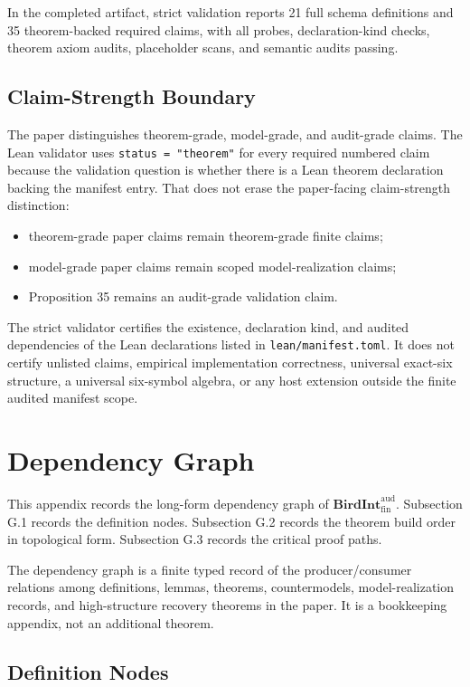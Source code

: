 \documentclass[11pt]{article}
\providecommand{\tightlist}{}
\theoremstyle{definition}
\begin{document}
In the completed artifact, strict validation reports 21 full schema definitions and 35 theorem-backed required claims, with all probes, declaration-kind checks, theorem axiom audits, placeholder scans, and semantic audits passing.

\subsection{Claim-Strength Boundary}

The paper distinguishes theorem-grade, model-grade, and audit-grade claims. The Lean validator uses \texttt{status\ =\ "theorem"} for every required numbered claim because the validation question is whether there is a Lean theorem declaration backing the manifest entry. That does not erase the paper-facing claim-strength distinction:

\begin{itemize}
\tightlist
\item
  theorem-grade paper claims remain theorem-grade finite claims;
\item
  model-grade paper claims remain scoped model-realization claims;
\item
  Proposition 35 remains an audit-grade validation claim.
\end{itemize}

The strict validator certifies the existence, declaration kind, and audited dependencies of the Lean declarations listed in \texttt{lean/manifest.toml}. It does not certify unlisted claims, empirical implementation correctness, universal exact-six structure, a universal six-symbol algebra, or any host extension outside the finite audited manifest scope.
 \section{Dependency Graph}

This appendix records the long-form dependency graph of \(\mathbf{BirdInt}^{\mathrm{aud}}_{\mathrm{fin}}\). Subsection G.1 records the definition nodes. Subsection G.2 records the theorem build order in topological form. Subsection G.3 records the critical proof paths.

The dependency graph is a finite typed record of the producer/consumer relations among definitions, lemmas, theorems, countermodels, model-realization records, and high-structure recovery theorems in the paper. It is a bookkeeping appendix, not an additional theorem.

\subsection{Definition Nodes}
\end{document}
